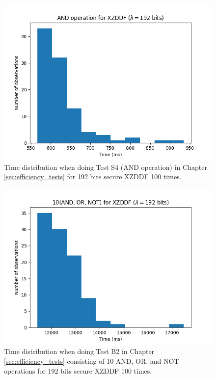 \begin{figure}[ht]
    \centering
    \includegraphics[width=0.8\linewidth]{data/figures/XZDDF_STD192_AND_operation.png}
    \caption{Time distribution when doing Test S4 (AND operation) in Chapter \ref{sec:efficiency_tests} for 192 bits secure XZDDF 100 times.}
    \label{fig:distr_xzddf192_and}
\end{figure}

\begin{figure}[ht]
    \centering
    \includegraphics[width=0.8\linewidth]{data/figures/XZDDF_STD192_10AND_OR_NOT.png}
    \caption{Time distribution when doing Test B2 in Chapter \ref{sec:efficiency_tests} consisting of 10 AND, OR, and NOT operations for 192 bits secure XZDDF 100 times.}
    \label{fig:distr_xzddf192_10}
\end{figure}







